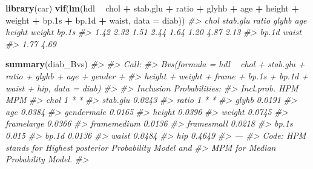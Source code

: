 \documentclass[]{book}
\newenvironment{Shaded}{\begin{snugshade}}{\end{snugshade}}
\newcommand{\KeywordTok}[1]{\textcolor[rgb]{0.13,0.29,0.53}{\textbf{#1}}}
\newcommand{\DataTypeTok}[1]{\textcolor[rgb]{0.13,0.29,0.53}{#1}}
\newcommand{\StringTok}[1]{\textcolor[rgb]{0.31,0.60,0.02}{#1}}
\newcommand{\CommentTok}[1]{\textcolor[rgb]{0.56,0.35,0.01}{\textit{#1}}}
\newcommand{\OperatorTok}[1]{\textcolor[rgb]{0.81,0.36,0.00}{\textbf{#1}}}
\newcommand{\NormalTok}[1]{#1}
\begin{document}
\begin{Shaded}
\begin{Highlighting}[]
\KeywordTok{library}\NormalTok{(car)}
\KeywordTok{vif}\NormalTok{(}\KeywordTok{lm}\NormalTok{(hdl }\OperatorTok{~}\StringTok{ }\NormalTok{chol }\OperatorTok{+}\StringTok{ }\NormalTok{stab.glu }\OperatorTok{+}\StringTok{ }\NormalTok{ratio }\OperatorTok{+}\StringTok{ }\NormalTok{glyhb }\OperatorTok{+}\StringTok{ }\NormalTok{age }\OperatorTok{+}\StringTok{ }\NormalTok{height }\OperatorTok{+}\StringTok{ }\NormalTok{weight }\OperatorTok{+}\StringTok{  }\NormalTok{bp.1s }\OperatorTok{+}\StringTok{ }\NormalTok{bp.1d }\OperatorTok{+}\StringTok{ }\NormalTok{waist, }\DataTypeTok{data =}\NormalTok{ diab))}
\CommentTok{#>     chol stab.glu    ratio    glyhb      age   height   weight    bp.1s }
\CommentTok{#>     1.42     2.32     1.51     2.44     1.64     1.20     4.87     2.13 }
\CommentTok{#>    bp.1d    waist }
\CommentTok{#>     1.77     4.69}
\end{Highlighting}
\end{Shaded}

\begin{Shaded}
\begin{Highlighting}[]
\KeywordTok{summary}\NormalTok{(diab_Bvs)}
\CommentTok{#> }
\CommentTok{#> Call:}
\CommentTok{#> Bvs(formula = hdl ~ chol + stab.glu + ratio + glyhb + age + gender + }
\CommentTok{#>     height + weight + frame + bp.1s + bp.1d + waist + hip, data = diab)}
\CommentTok{#> }
\CommentTok{#> Inclusion Probabilities:}
\CommentTok{#>             Incl.prob. HPM MPM}
\CommentTok{#> chol                 1   *   *}
\CommentTok{#> stab.glu        0.0243        }
\CommentTok{#> ratio                1   *   *}
\CommentTok{#> glyhb           0.0191        }
\CommentTok{#> age             0.0384        }
\CommentTok{#> gendermale      0.0165        }
\CommentTok{#> height          0.0396        }
\CommentTok{#> weight          0.0745        }
\CommentTok{#> framelarge      0.0366        }
\CommentTok{#> framemedium     0.0136        }
\CommentTok{#> framesmall      0.0218        }
\CommentTok{#> bp.1s            0.015        }
\CommentTok{#> bp.1d           0.0136        }
\CommentTok{#> waist           0.0484        }
\CommentTok{#> hip             0.4649        }
\CommentTok{#> ---}
\CommentTok{#> Code: HPM stands for Highest posterior Probability Model and}
\CommentTok{#>  MPM for Median Probability Model.}
\CommentTok{#> }
\end{Highlighting}
\end{Shaded}
\end{document}
